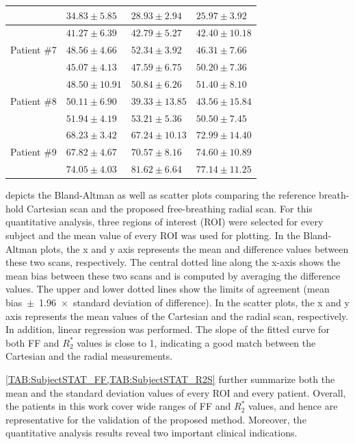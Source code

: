 \documentclass[journal,twoside,web]{ieeecolor}
\begin{document}
\begin{table}[h!]
\begin{tabular}{m{} m{} m{} m{}}
        & $34.83 \pm 5.85$ & $28.93 \pm 2.94$ & $25.97 \pm 3.92$ \\
		\hline
		\multirow[t]{3}{*}{Patient \#7}   
		& $41.27 \pm 6.39$ & $42.79 \pm 5.27$ & $42.40 \pm 10.18$ \\ %
        & $48.56 \pm 4.66$ & $52.34 \pm 3.92$ & $46.31 \pm 7.66$ \\
        & $45.07 \pm 4.13$ & $47.59 \pm 6.75$ & $50.20 \pm 7.36$ \\
		\hline
		\multirow[t]{3}{*}{Patient \#8}   
		& $48.50 \pm 10.91$ & $50.84 \pm 6.26$ & $51.40 \pm 8.10$ \\ %
        & $50.11 \pm  6.90$ & $39.33 \pm 13.85$ & $43.56 \pm 15.84$ \\
        & $51.94 \pm  4.19$ & $53.21 \pm 5.36$ & $50.50 \pm 7.45$ \\
		\hline
		\multirow[t]{3}{*}{Patient \#9}   
		& $68.23 \pm 3.42$ & $67.24 \pm 10.13$ & $72.99 \pm 14.40$ \\ %
        & $67.82 \pm 4.67$ & $70.57 \pm 8.16$ & $74.60 \pm 10.89$ \\
        & $74.05 \pm 4.03$ & $81.62 \pm 6.64$ & $77.14 \pm 11.25$ \\
		\bottomrule
	\end{tabular}
\end{table}


 depicts the Bland-Altman as well as scatter plots 
comparing the reference breath-hold Cartesian scan and 
the proposed free-breathing radial scan. 
For this quantitative analysis, three regions of interest (ROI) 
were selected for every subject and the mean value of every ROI 
was used for plotting. 
In the Bland-Altman plots, the x and y axis represents 
the mean and difference values between these two scans, 
respectively.
The central dotted line along the x-axis shows the mean bias 
between these two scans and is computed by averaging the difference values.
The upper and lower dotted lines show the limits of agreement 
(mean bias~$\pm$~1.96~$\times$~standard deviation of difference). 
In the scatter plots, the x and y axis represents the mean values of 
the Cartesian and the radial scan, respectively. 
In addition, linear regression was performed. 
The slope of the fitted curve for both FF and $R_2^*$ values is close to 1, 
indicating a good match between the Cartesian and the radial measurements.

\cref{TAB:SubjectSTAT_FF,TAB:SubjectSTAT_R2S} further summarize 
both the mean and the standard deviation values of every ROI and every patient. 
Overall, the patients in this work cover wide ranges of FF and $R_2^*$ values, 
and hence are representative for the validation of the proposed method. 
Moreover, the quantitative analysis results reveal two important clinical indications.
\end{document}
